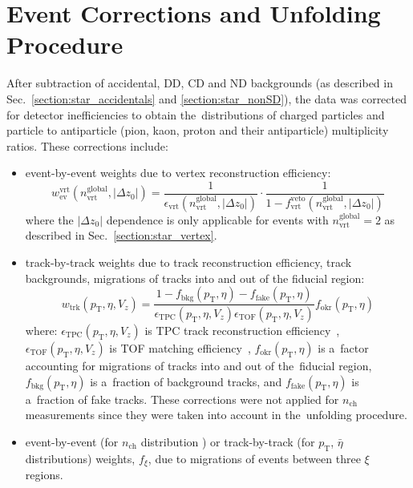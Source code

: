 \chapter{Event Corrections and Unfolding Procedure}\label{section:star_corrections}
After subtraction of accidental, \ac{DD}, \ac{CD} and \ac{ND} backgrounds (as described in Sec.~\ref{section:star_accidentals} and \ref{section:star_nonSD}), the data was corrected for detector inefficiencies to obtain the~distributions of charged particles and particle to antiparticle (pion, kaon, proton and their antiparticle) multiplicity ratios. These corrections include:
\begin{itemize}
	\item event-by-event weights due to vertex reconstruction efficiency:
	\begin{equation}
	w_\textrm{ev}^\textrm{vrt}\left(n_\textrm{vrt}^\textrm{global}, |\Delta z_0|\right)=\frac{1}{\epsilon_\textrm{vrt}\left(n_\textrm{vrt}^\textrm{global}, |\Delta z_0|\right)}\cdot\frac{1}{1-f_\textrm{vrt}^\textrm{veto}\left(n_\textrm{vrt}^\textrm{global}, |\Delta z_0|\right)}
	\label{eq:vertexCorrection}
	\end{equation}
	where the 	$|\Delta z_0|$ dependence is only applicable for events with $n_\textrm{vrt}^\textrm{global}=2$ as described in Sec.~\ref{section:star_vertex}.
	\item track-by-track weights due to track reconstruction efficiency, track backgrounds, migrations of tracks into and out of the fiducial region:
	\begin{equation}
	w_\textrm{trk}\left(p_\textrm{T},\eta,V_{z}\right)=\frac{1-f_\textrm{bkg}\left(p_\textrm{T},\eta\right)-f_\textrm{fake}\left(p_\textrm{T},\eta\right)}{\epsilon_\textrm{TPC}\left(p_\textrm{T},\eta,V_{z}\right)\epsilon_\textrm{TOF}\left(p_\textrm{T},\eta,V_{z}\right)}f_\textrm{okr}\left(p_\textrm{T},\eta\right)
	\label{eq:trackCorrection}
	\end{equation}
	where: $\epsilon_\textrm{TPC}\left(p_\textrm{T},\eta,V_{z}\right)$ is TPC track reconstruction efficiency~\cite{supplementaryNote}, $\epsilon_\textrm{TOF}\left(p_\textrm{T},\eta,V_{z}\right)$ is TOF matching efficiency~\cite{supplementaryNote}, $f_\textrm{okr}\left(p_\textrm{T},\eta\right)$ is a~factor accounting for migrations of tracks into and out of the~fiducial region, $f_\textrm{bkg}\left(p_\textrm{T},\eta\right)$ is a~fraction of background tracks, and $f_\textrm{fake}\left(p_\textrm{T},\eta\right)$ is a~fraction of fake tracks. These corrections were not applied for $n_\textrm{ch}$ measurements since they were taken into account in the~unfolding procedure.
	\item event-by-event (for $n_\textrm{ch}$ distribution ) or track-by-track (for $p_\textrm{T}$, $\bar{\eta}$ distributions) weights, $f_{\xi}$, due to migrations of events between three $\xi$ regions.
\end{itemize}
